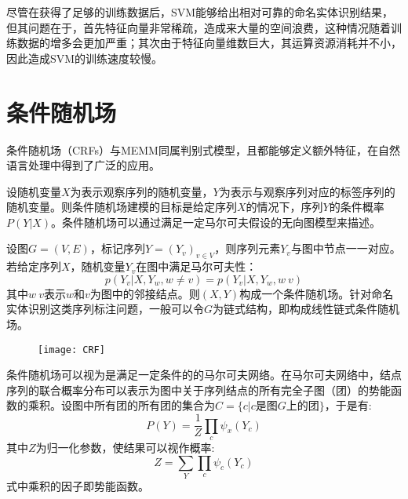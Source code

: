 尽管在获得了足够的训练数据后，SVM能够给出相对可靠的命名实体识别结果，但其问题在于，首先特征向量非常稀疏，造成来大量的空间浪费，这种情况随着训练数据的增多会更加严重；其次由于特征向量维数巨大，其运算资源消耗并不小，因此造成SVM的训练速度较慢。

\section{条件随机场}
条件随机场（CRFs）与MEMM同属判别式模型，且都能够定义额外特征，在自然语言处理中得到了广泛的应用。

设随机变量$X$为表示观察序列的随机变量，$Y$为表示与观察序列对应的标签序列的随机变量。则条件随机场建模的目标是给定序列$X$的情况下，序列$Y$的条件概率$P(Y|X)$。条件随机场可以通过满足一定马尔可夫假设的无向图模型来描述。

设图$G=(V,E)$，标记序列$Y = (Y_v)_{v\in V}$，则序列元素$Y_v$与图中节点一一对应。若给定序列$X$，随机变量$Y_v$在图中满足马尔可夫性：
\begin{equation}
    p(Y_v|X, Y_w, w\neq v) = p(Y_v|X,Y_w,w~v)
    \label{eq:Markov-in-CRF}
\end{equation}
其中$w~v$表示$w$和$v$为图中的邻接结点。则$(X, Y)$构成一个条件随机场。针对命名实体识别这类序列标注问题，一般可以令$G$为链式结构，即构成线性链式条件随机场。

\begin{figure}[H]
    \centering
    \texttt{[image: CRF]}
    \label{fig:CRF}
\end{figure}

条件随机场可以视为是满足一定条件的的马尔可夫网络。在马尔可夫网络中，结点序列的联合概率分布可以表示为图中关于序列结点的所有完全子图（团）的势能函数的乘积。设图中所有团的所有团的集合为$C = \{c|c$是图$G$上的团$\}$，于是有:
\begin{equation}
    P(Y) = \frac{1}{Z}\prod_{c}\psi_x(Y_c)
\end{equation}
其中$Z$为归一化参数，使结果可以视作概率:
\begin{equation}
    Z = \sum_Y\prod_c \psi_c(Y_c)
\end{equation}
式中乘积的因子即势能函数。

